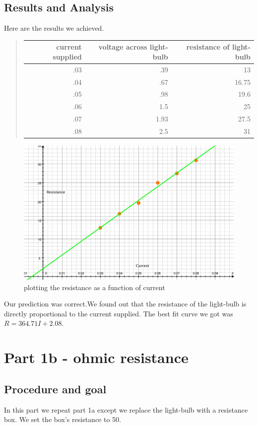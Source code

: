 \documentclass[12pt]{article}
\begin{document}
\subsection*{Results and Analysis}
Here are the results we achieved.  
\begin{quote}
	\begin{tabular}{|r|r|r|}
	\hline 
	current supplied & voltage across light-bulb & resistance of light-bulb \\
	\hline 
	.03 & .39 & 13 \\
	.04 & .67 & 16.75 \\
	.05 & .98 & 19.6 \\
	.06 & 1.5 & 25 \\
	.07 & 1.93 & 27.5 \\
	.08 & 2.5 & 31 \\
	\hline 
	\end{tabular}
\end{quote}
\begin{figure}[h]
	 \centering
	 \includegraphics[scale = .51]{graph1}
	 \caption{plotting the resistance as a function of current}
\end{figure}

Our prediction was correct.We found out that the resistance of the light-bulb is directly proportional to the current supplied. The best fit curve we got was $R = 364.71I + 2.08$.
\section*{Part 1b - ohmic resistance}
\subsection*{Procedure and goal}
In this part we repeat part 1a except we replace the light-bulb with a resistance box. We set the box's resistance to 50.
\end{document}
